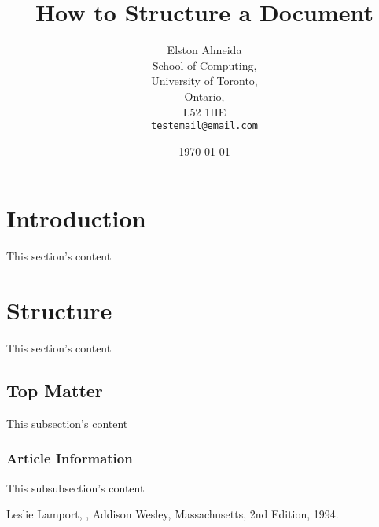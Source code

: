 \documentclass{article}
\begin{document}
\title{How to Structure a \Latex{} Document}
\author{Elston Almeida\\
  School of Computing,\\
  University of Toronto,\\
  Ontario,\\
  L52 1HE\\
  \texttt{testemail@email.com}}
\date{\today}
\maketitle

\section{Introduction}
This section's content

\section{Structure}
This section's content

\subsection{Top Matter}
This subsection's content

\subsubsection{Article Information}

This subsubsection's content

\begin{thebibliography}{9}

  Leslie Lamport,
  ,
  Addison Wesley, Massachusetts,
  2nd Edition,
  1994.

\end{thebibliography}
\end{document}
